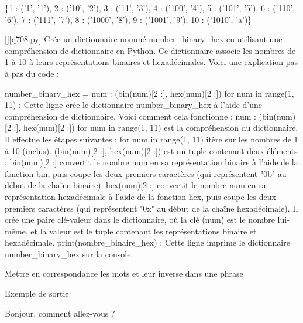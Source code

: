 \{1 : ('1', '1'), 2 : ('10', '2'), 3 : ('11', '3'), 4 : ('100', '4'), 5 : ('101', '5'), 6 : ('110', '6'), 7 : ('111', '7'), 8 : ('1000', '8'), 9 : ('1001', '9'), 10 : ('1010', 'a')\}
        \par
        \begin{solution}
            \renewcommand{\nomfichier}{q708.py}
            \pythonfile{\chemincode \nomfichier}[][\nomfichier]
            Crée un dictionnaire nommé number_binary_hex en utilisant une compréhension de dictionnaire en Python. Ce dictionnaire associe les nombres de 1 à 10 à leurs représentations binaires et hexadécimales. Voici une explication pas à pas du code :

    number_binary_hex = {num : (bin(num)[2 :], hex(num)[2 :]) for num in range(1, 11)} : Cette ligne crée le dictionnaire number_binary_hex à l'aide d'une compréhension de dictionnaire. Voici comment cela fonctionne :
        {num : (bin(num)[2 :], hex(num)[2 :]) for num in range(1, 11)} est la compréhension du dictionnaire. Il effectue les étapes suivantes :
        for num in range(1, 11) itère sur les nombres de 1 à 10 (inclus).
        (bin(num)[2 :], hex(num)[2 :]) est un tuple contenant deux éléments :
            bin(num)[2 :] convertit le nombre num en sa représentation binaire à l'aide de la fonction bin, puis coupe les deux premiers caractères (qui représentent "0b" au début de la chaîne binaire).
            hex(num)[2 :] convertit le nombre num en sa représentation hexadécimale à l'aide de la fonction hex, puis coupe les deux premiers caractères (qui représentent "0x" au début de la chaîne hexadécimale).
        Il crée une paire clé-valeur dans le dictionnaire, où la clé (num) est le nombre lui-même, et la valeur est le tuple contenant les représentations binaire et hexadécimale.
    print(nombre_binaire_hex) : Cette ligne imprime le dictionnaire number_binary_hex sur la console.
        \end{solution}
        

        \question
        Mettre en correspondance les mots et leur inverse dans une phrase

Exemple de sortie

Bonjour, comment allez-vous ?

